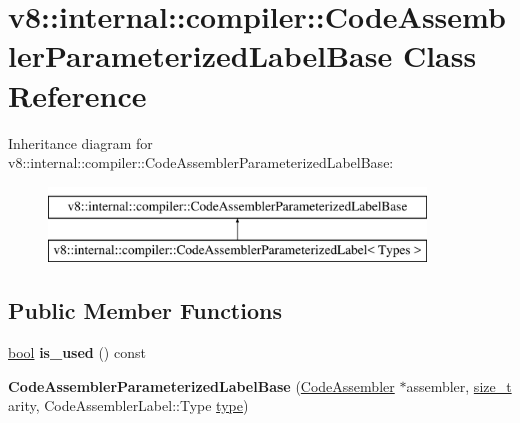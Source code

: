 \hypertarget{classv8_1_1internal_1_1compiler_1_1CodeAssemblerParameterizedLabelBase}{}\section{v8\+:\+:internal\+:\+:compiler\+:\+:Code\+Assembler\+Parameterized\+Label\+Base Class Reference}
\label{classv8_1_1internal_1_1compiler_1_1CodeAssemblerParameterizedLabelBase}
Inheritance diagram for v8\+:\+:internal\+:\+:compiler\+:\+:Code\+Assembler\+Parameterized\+Label\+Base\+:\begin{figure}[H]
\begin{center}
\leavevmode
\includegraphics[height=2.000000cm]{classv8_1_1internal_1_1compiler_1_1CodeAssemblerParameterizedLabelBase}
\end{center}
\end{figure}
\subsection*{Public Member Functions}
\begin{DoxyCompactItemize}
\item 
\mbox{\label{classv8_1_1internal_1_1compiler_1_1CodeAssemblerParameterizedLabelBase_a92322d877bfa4079d2bc6fdfdc72f1ae}} 
\mbox{\hyperlink{classbool}{bool}} {\bfseries is\+\_\+used} () const
\item 
\mbox{\label{classv8_1_1internal_1_1compiler_1_1CodeAssemblerParameterizedLabelBase_a2ba66e072b5785d78045e64fb25f6e01}} 
{\bfseries Code\+Assembler\+Parameterized\+Label\+Base} (\mbox{\hyperlink{classv8_1_1internal_1_1compiler_1_1CodeAssembler}{Code\+Assembler}} $\ast$assembler, \mbox{\hyperlink{classsize__t}{size\+\_\+t}} arity, Code\+Assembler\+Label\+::\+Type \mbox{\hyperlink{classstd_1_1conditional_1_1type}{type}})
\end{DoxyCompactItemize}
